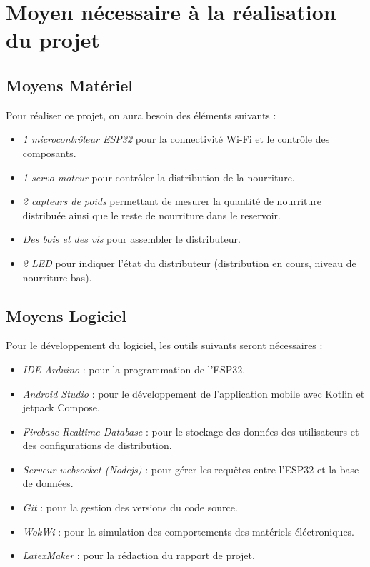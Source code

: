 \section{Moyen nécessaire à la réalisation du projet}
	\subsection{Moyens Matériel}
	Pour réaliser ce projet, on aura besoin des éléments suivants :
		\begin{itemize}
			\item \textit{1 microcontrôleur ESP32} pour la connectivité Wi-Fi et le contrôle des composants.
			\item \textit{1 servo-moteur} pour contrôler la distribution de la nourriture.
			\item \textit{2 capteurs de poids} permettant de mesurer la quantité de nourriture distribuée ainsi que le reste de nourriture dans le reservoir.
			\item \textit{Des bois et des vis} pour assembler le distributeur.
			\item \textit{2 LED} pour indiquer l'état du distributeur (distribution en cours, niveau de nourriture bas).
		\end{itemize}
	\subsection{Moyens Logiciel}
	Pour le développement du logiciel, les outils suivants seront nécessaires :
		\begin{itemize}
			\item \textit{IDE Arduino} : pour la programmation de l'ESP32.
			\item \textit{Android Studio} : pour le développement de l'application mobile avec Kotlin et jetpack Compose.
			\item \textit{Firebase Realtime Database} : pour le stockage des données des utilisateurs et des configurations de distribution.
			\item \textit{Serveur websocket (Nodejs)} : pour gérer les requêtes entre l'ESP32 et la base de données.
			\item \textit{Git} : pour la gestion des versions du code source.
			\item \textit{WokWi} : pour la simulation des comportements des matériels éléctroniques.
			\item \textit{LatexMaker} : pour la rédaction du rapport de projet.
		\end{itemize}
	
